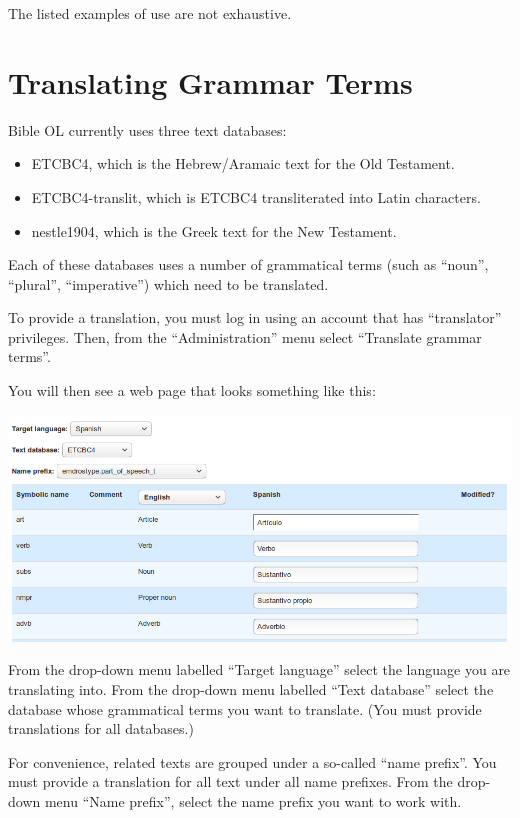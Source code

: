\documentclass[11pt,oneside,a4paper]{memoir}
\begin{document}
The listed examples of use are not exhaustive.


\chapter{Translating Grammar Terms}

Bible OL currently uses three text databases:

\begin{itemize}
\item ETCBC4, which is the Hebrew/Aramaic text for the Old Testament.
\item ETCBC4-translit, which is ETCBC4 transliterated into Latin characters.
\item nestle1904, which is the Greek text for the New Testament.
\end{itemize}

Each of these databases uses a number of grammatical terms (such as ``noun'', ``plural'',
``imperative'') which need to be translated.

To provide a translation, you must log in using an account that has ``translator'' privileges. Then,
from the ``Administration'' menu select ``Translate grammar terms''.

You will then see a web page that looks something like this:

\begin{center}
  \includegraphics[width=0.9\linewidth]{grammar.png}
\end{center}

From the drop-down menu labelled ``Target language'' select the language you are translating into.
From the drop-down menu labelled ``Text database'' select the database whose grammatical terms you
want to translate. (You must provide translations for all databases.)

For convenience, related texts are grouped under a so-called ``name prefix''. You must provide a
translation for all text under all name prefixes. From the drop-down menu ``Name prefix'', select
the name prefix you want to work with.
\end{document}
